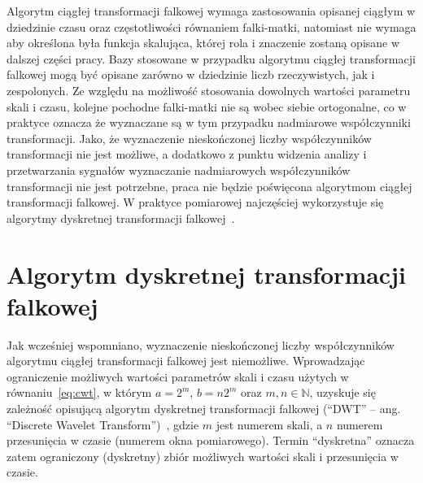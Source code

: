 Algorytm ciągłej transformacji falkowej wymaga zastosowania opisanej ciągłym w dziedzinie czasu oraz częstotliwości równaniem falki-matki, natomiast nie wymaga aby określona była funkcja skalująca, której rola i znaczenie zostaną opisane w dalszej części pracy. Bazy stosowane w przypadku algorytmu ciągłej transformacji falkowej mogą być opisane zarówno w dziedzinie liczb rzeczywistych, jak i zespolonych. Ze względu na możliwość stosowania dowolnych wartości parametru skali i czasu, kolejne pochodne falki-matki nie są wobec siebie ortogonalne, co w praktyce oznacza że wyznaczane są w tym przypadku nadmiarowe współczynniki transformacji. Jako, że wyznaczenie nieskończonej liczby współczynników transformacji nie jest możliwe, a dodatkowo z punktu widzenia analizy i przetwarzania sygnałów wyznaczanie nadmiarowych współczynników transformacji nie jest potrzebne, praca nie będzie poświęcona algorytmom ciągłej transformacji falkowej. W praktyce pomiarowej najczęściej wykorzystuje się algorytmy dyskretnej transformacji falkowej~\cite{wallen_handbook}.

\section{Algorytm dyskretnej transformacji falkowej}

Jak wcześniej wspomniano, wyznaczenie nieskończonej liczby współczynników algorytmu ciągłej transformacji falkowej jest niemożliwe. Wprowadzając ograniczenie możliwych wartości parametrów skali i czasu użytych w równaniu~\eqref{eq:cwt}, w którym $a = 2^m$, $b = n2^m$ oraz $m, n \in \mathbb{N}$, uzyskuje się zależność opisującą algorytm dyskretnej transformacji falkowej (\enquote{DWT} -- ang. \enquote{Discrete Wavelet Transform})~\cite{wallen_handbook}, gdzie $m$ jest numerem skali, a $n$ numerem przesunięcia w czasie (numerem okna pomiarowego). Termin \enquote{dyskretna} oznacza zatem ograniczony (dyskretny) zbiór możliwych wartości skali i przesunięcia w czasie.


